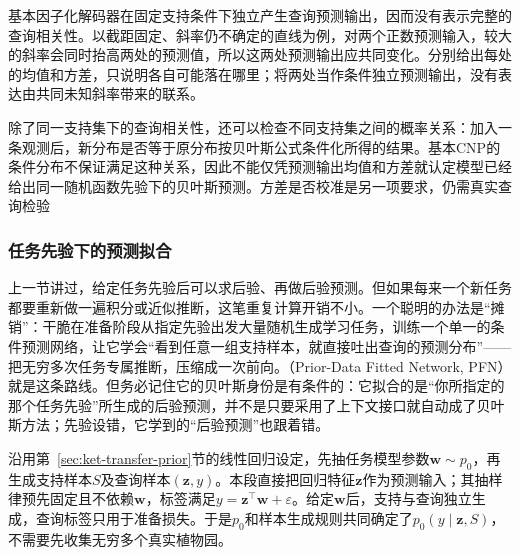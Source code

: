 基本因子化解码器在固定支持条件下独立产生查询预测输出，因而没有表示完整的查询相关性。以截距固定、斜率仍不确定的直线为例，对两个正数预测输入，较大的斜率会同时抬高两处的预测值，所以这两处预测输出应共同变化。分别给出每处的均值和方差，只说明各自可能落在哪里；将两处当作条件独立预测输出，没有表达由共同未知斜率带来的联系。

除了同一支持集下的查询相关性，还可以检查不同支持集之间的概率关系：加入一条观测后，新分布是否等于原分布按贝叶斯公式条件化所得的结果。基本CNP的条件分布不保证满足这种关系，因此不能仅凭预测输出均值和方差就认定模型已经给出同一随机函数先验下的贝叶斯预测。方差是否校准是另一项要求，仍需真实查询检验

\subsubsection{任务先验下的预测拟合}
\label{sec:ket-transfer-pfn}

上一节讲过，给定任务先验后可以求后验、再做后验预测。但如果每来一个新任务都要重新做一遍积分或近似推断，这笔重复计算开销不小。一个聪明的办法是“摊销”：干脆在准备阶段从指定先验出发大量随机生成学习任务，训练一个单一的条件预测网络，让它学会“看到任意一组支持样本，就直接吐出查询的预测分布”——把无穷多次任务专属推断，压缩成一次前向。（Prior-Data Fitted Network, PFN）就是这条路线。但务必记住它的贝叶斯身份是有条件的：它拟合的是“你所指定的那个任务先验”所生成的后验预测，并不是只要采用了上下文接口就自动成了贝叶斯方法；先验设错，它学到的“后验预测”也跟着错。

沿用第~\ref{sec:ket-transfer-prior}节的线性回归设定，先抽任务模型参数$\bm w\sim p_0$，再生成支持样本$S$及查询样本$(\bm z,y)$。本段直接把回归特征$\bm z$作为预测输入；其抽样律预先固定且不依赖$\bm w$，标签满足$y=\bm z^{\top}\bm w+\varepsilon$。给定$\bm w$后，支持与查询独立生成，查询标签只用于准备损失。于是$p_0$和样本生成规则共同确定了$p_0(y\mid\bm z,S)$，不需要先收集无穷多个真实植物园。

